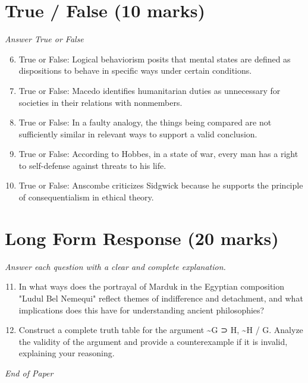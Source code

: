 \documentclass[12pt]{article}
\begin{document}
\section*{True / False (10 marks)}
\textit{Answer True or False}
\begin{enumerate}[label=\arabic*.]
\setcounter{enumi}{5}
\item True or False: Logical behaviorism posits that mental states are defined as dispositions to behave in specific ways under certain conditions.
\item True or False: Macedo identifies humanitarian duties as unnecessary for societies in their relations with nonmembers.
\item True or False: In a faulty analogy, the things being compared are not sufficiently similar in relevant ways to support a valid conclusion.
\item True or False: According to Hobbes, in a state of war, every man has a right to self-defense against threats to his life.
\item True or False: Anscombe criticizes Sidgwick because he supports the principle of consequentialism in ethical theory.
\end{enumerate}

\section*{Long Form Response (20 marks)}
\textit{Answer each question with a clear and complete explanation.}
\begin{enumerate}[label=\arabic*.]
\setcounter{enumi}{10}
\item In what ways does the portrayal of Marduk in the Egyptian composition "Ludul Bel Nemequi" reflect themes of indifference and detachment, and what implications does this have for understanding ancient philosophies?
\item Construct a complete truth table for the argument \textasciitilde{}G ⊃ H, \textasciitilde{}H / G. Analyze the validity of the argument and provide a counterexample if it is invalid, explaining your reasoning.
\end{enumerate}

\vfill
\noindent\textit{End of Paper}
\end{document}
